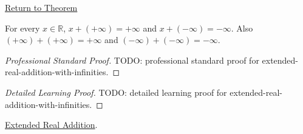 \newpage
{}
\label{prf:extended-real-addition-with-infinities}
\begin{remark*}[Return]
\hyperref[thm:extended-real-addition-with-infinities]{Return to Theorem}
\end{remark*}
\begin{theorem*}
For every $x\in\mathbb{R}$, $x+(+\infty)=+\infty$ and
$x+(-\infty)=-\infty$. Also $(+\infty)+(+\infty)=+\infty$ and
$(-\infty)+(-\infty)=-\infty$.
\end{theorem*}
\begin{proof}[Professional Standard Proof]
\LRAProofBodyStart
TODO: professional standard proof for extended-real-addition-with-infinities.
\end{proof}
\begin{proof}[Detailed Learning Proof]
\LRAProofBodyStart
TODO: detailed learning proof for extended-real-addition-with-infinities.
\end{proof}
\begin{remark*}
\end{remark*}
\begin{dependencies}
\hyperref[def:extended-real-addition]{Extended Real Addition}.
\end{dependencies}
\clearpage
